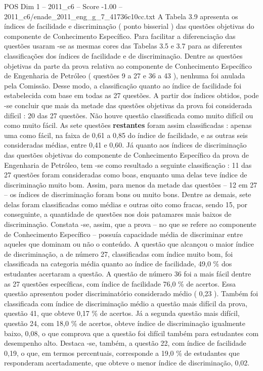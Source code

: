 \begin{textsample}{POS Dim 1 – 2011\_c6 – Score -1.00 – 2011\_c6/enade\_2011\_eng\_g\_7\_41736c10cc.txt}
A Tabela 3.9 apresenta os índices de facilidade e discriminação ( ponto bisserial ) das questões objetivas do componente de Conhecimento Específico.
Para facilitar a diferenciação das questões usaram -se as mesmas cores das Tabelas 3.5 e 3.7 para as diferentes classificações dos índices de facilidade e de discriminação.
Dentre as questões objetivas da parte da prova relativa ao componente de Conhecimento Específico de Engenharia de Petróleo ( questões 9 a 27 e 36 a 43 ), nenhuma foi anulada pela Comissão.
Desse modo, a classificação quanto ao índice de facilidade foi estabelecida com base em todas as 27 questões.
A partir dos índices obtidos, pode -se concluir que mais da metade das questões objetivas da prova foi considerada difícil : 20 das 27 questões.
Não houve questão classificada como muito difícil ou como muito fácil.
As sete questões \textbf{restantes} foram assim classificadas : apenas uma como fácil, na faixa de 0,61 a 0,85 do índice de facilidade, e as outras seis consideradas médias, entre 0,41 e 0,60.
Já quanto aos índices de discriminação das questões objetivas do componente de Conhecimento Específico da prova de Engenharia de Petróleo, tem -se como resultado a seguinte classificação : 11 das 27 questões foram consideradas como boas, enquanto uma delas teve índice de discriminação muito bom.
Assim, para menos da metade das questões – 12 em 27 – os índices de discriminação foram bons ou muito bons.
Dentre as demais, sete delas foram classificadas como médias e outras oito como fracas, sendo 15, por conseguinte, a quantidade de questões nos dois patamares mais baixos de discriminação.
Constata -se, assim, que a prova – no que se refere ao componente de Conhecimento Específico – possuía capacidade média de discriminar entre aqueles que dominam ou não o conteúdo.
A questão que alcançou o maior índice de discriminação, a de número 27, classificadas com índice muito bom, foi classificada na categoria média quanto ao índice de facilidade, 49,0 \% dos estudantes acertaram a questão.
A questão de número 36 foi a mais fácil dentre as 27 questões específicas, com índice de facilidade 76,0 \% de acertos.
Essa questão apresentou poder discriminatório considerado médio ( 0,23 ).
Também foi classificada com índice de discriminação médio a questão mais difícil da prova, questão 41, que obteve 0,17 \% de acertos.
Já a segunda questão mais difícil, questão 24, com 18,0 \% de acertos, obteve índice de discriminação igualmente baixo, 0,08, o que comprova que a questão foi difícil também para estudantes com desempenho alto.
Destaca -se, também, a questão 22, com índice de facilidade 0,19, o que, em termos percentuais, corresponde a 19,0 \% de estudantes que responderam acertadamente, que obteve o menor índice de discriminação, 0,02.

\end{textsample}
